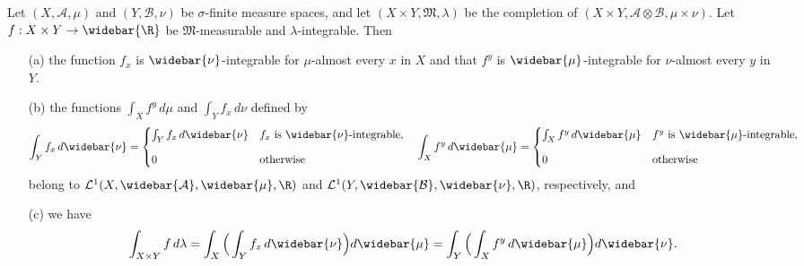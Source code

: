 \begin{theorem}
Let $(X,\mathcal{A},\mu)$ and $(Y,\mathcal{B},\nu)$ be $\sigma$-finite measure spaces, and let $(X\times Y,\mathfrak{M},\lambda)$ be the completion of $(X\times Y,\mathcal{A}\otimes\mathcal{B},\mu\times\nu)$. Let $f:X\times Y\to\widebar{\R}$ be $\mathfrak{M}$-measurable and $\lambda$-integrable. Then
\begin{itemize}
\item[(a)] the function $f_x$ is $\widebar{\nu}$-integrable for $\mu$-almost every $x$ in $X$ and that $f^y$ is $\widebar{\mu}$-integrable for $\nu$-almost every $y$ in $Y$.
\item[(b)] the functions $\int_Xf^y\,d\mu$ and $\int_Yf_x\,d\nu$ defined by
\[\int_Yf_x\,d\widebar{\nu}=\begin{cases}
\int_Yf_x\,d\widebar{\nu}&\text{$f_x$ is $\widebar{\nu}$-integrable},\\[8pt]
0&\text{otherwise}
\end{cases}\quad\int_Xf^y\,d\widebar{\mu}=\begin{cases}
\int_Xf^y\,d\widebar{\mu}&\text{$f^y$ is $\widebar{\mu}$-integrable},\\[8pt]
0&\text{otherwise}
\end{cases}\]
belong to $\mathcal{L}^1(X,\widebar{\mathcal{A}},\widebar{\mu},\R)$ and $\mathcal{L}^1(Y,\widebar{\mathcal{B}},\widebar{\nu},\R)$, respectively, and
\item[(c)] we have
\[\int_{X\times Y}f\,d\lambda=\int_X\Big(\int_Yf_x\,d\widebar{\nu}\Big)d\widebar{\mu}=\int_Y\Big(\int_Xf^y\,d\widebar{\mu}\Big)d\widebar{\nu}.\]
\end{itemize}
\end{theorem}
